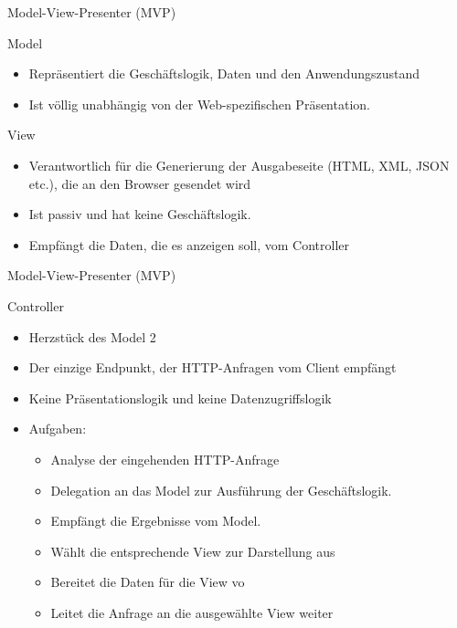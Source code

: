 \begin{frame}{Model-View-Presenter (MVP)}
	\begin{block}{Model}
		\begin{itemize}
		  \item Repräsentiert die Geschäftslogik, Daten und den Anwendungszustand
		  \item Ist völlig unabhängig von der Web-spezifischen Präsentation.
		\end{itemize}
	\end{block}
	\pause
	\begin{block}{View}
		\begin{itemize}
		  \item Verantwortlich für die Generierung der Ausgabeseite (HTML, XML, JSON etc.), die an den Browser gesendet wird
		  \item Ist passiv und hat keine Geschäftslogik.
		  \item Empfängt die Daten, die es anzeigen soll, vom Controller 
		\end{itemize}
	\end{block}
\end{frame}

\begin{frame}{Model-View-Presenter (MVP)}
	\begin{block}{Controller}
		\begin{itemize}
		  \item Herzstück des Model 2
		  \item Der einzige Endpunkt, der HTTP-Anfragen vom Client empfängt
		  \item Keine Präsentationslogik und keine Datenzugriffslogik
		  \item Aufgaben:
		  	\begin{itemize}
			  \item Analyse der eingehenden HTTP-Anfrage
			  \item Delegation an das Model zur Ausführung der Geschäftslogik.
			  \item Empfängt die Ergebnisse vom Model.
			  \item Wählt die entsprechende View zur Darstellung aus
			  \item Bereitet die Daten für die View vo
			  \item Leitet die Anfrage an die ausgewählte View weiter 
			\end{itemize}
		\end{itemize}
	\end{block}
\end{frame}

